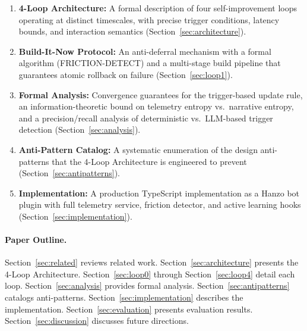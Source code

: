 \documentclass[11pt]{article}
\begin{document}
\begin{enumerate}[leftmargin=1.5em]
    \item \textbf{4-Loop Architecture:} A formal description of four
          self-improvement loops operating at distinct timescales, with
          precise trigger conditions, latency bounds, and interaction semantics
          (Section~\ref{sec:architecture}).

    \item \textbf{Build-It-Now Protocol:} An anti-deferral mechanism with a
          formal algorithm (FRICTION-DETECT) and a multi-stage build pipeline
          that guarantees atomic rollback on failure
          (Section~\ref{sec:loop1}).

    \item \textbf{Formal Analysis:} Convergence guarantees for the
          trigger-based update rule, an information-theoretic bound on
          telemetry entropy vs.\ narrative entropy, and a precision/recall
          analysis of deterministic vs.\ LLM-based trigger detection
          (Section~\ref{sec:analysis}).

    \item \textbf{Anti-Pattern Catalog:} A systematic enumeration of the
          design anti-patterns that the 4-Loop Architecture is engineered to
          prevent (Section~\ref{sec:antipatterns}).

    \item \textbf{Implementation:} A production TypeScript implementation
          as a Hanzo bot plugin with full telemetry service, friction
          detector, and active learning hooks (Section~\ref{sec:implementation}).
\end{enumerate}

\paragraph{Paper Outline.}
Section~\ref{sec:related} reviews related work.
Section~\ref{sec:architecture} presents the 4-Loop Architecture.
Section~\ref{sec:loop0} through Section~\ref{sec:loop4} detail each loop.
Section~\ref{sec:analysis} provides formal analysis.
Section~\ref{sec:antipatterns} catalogs anti-patterns.
Section~\ref{sec:implementation} describes the implementation.
Section~\ref{sec:evaluation} presents evaluation results.
Section~\ref{sec:discussion} discusses future directions.

\end{document}

